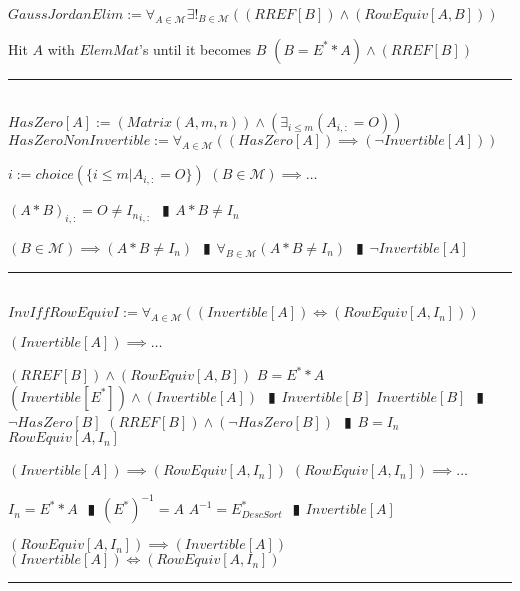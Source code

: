 \documentclass{book}
\newcommand{\abr}{:=}
\newcommand{\pipe}{$\phantom{(}\vrectangleblack\phantom{)}$}
\newcommand{\pr}[1]{\left(#1\right)}
\begin{document}
$GaussJordanElim \abr \forall_{A \in \mathcal{M}} \exists!_{B \in \mathcal{M}}\pr{(RREF[B]) \land (RowEquiv[A, B])}$
\begin{enumerate}
  \lit Hit $A$ with $ElemMat$'s until it becomes $B$
  \lit $(B = E^* * A) \land (RREF[B])$
\end{enumerate} \vspace{.75mm} \hrule \vspace{.75mm} \ \\ 

$HasZero[A] \abr \pr{Matrix(A, m, n)} \land \pr{\exists_{i \leq m}(A_{i, :} = O)}$ \\

$HasZeroNonInvertible \abr \forall_{A \in \mathcal{M}}\pr{(HasZero[A]) \implies (\lnot Invertible[A])}$
\begin{enumerate}
  \lit $i \abr choice(\{i \leq m | A_{i, :} = O\})$
  \lit $(B \in \mathcal{M}) \implies \ldots$
  \begin{enumerate}
    \lit $(A * B)_{i, :} = O \neq {I_n}_{i, :}$ \pipe $A * B \neq I_n$
  \end{enumerate}
  \lit $(B \in \mathcal{M}) \implies (A * B \neq I_n)$ \pipe $\forall_{B \in \mathcal{M}}(A * B \neq I_n)$ \pipe $\lnot Invertible[A]$
\end{enumerate} \vspace{.75mm} \hrule \vspace{.75mm} \ \\ 

$InvIffRowEquivI \abr \forall_{A \in \mathcal{M}}\pr{(Invertible[A]) \iff (RowEquiv[A, I_n])}$
\begin{enumerate}
  \lit $(Invertible[A]) \implies \ldots$
  \begin{enumerate}
    \lit $(RREF[B]) \land (RowEquiv[A, B])$
    \lit $B = E^* * A$
    \lit $(Invertible[E^*]) \land (Invertible[A])$ \pipe $Invertible[B]$
    \lit $Invertible[B]$ \pipe $\lnot HasZero[B]$
    \lit $(RREF[B]) \land (\lnot HasZero[B])$ \pipe $B = I_n$
    \lit $RowEquiv[A, I_n]$
  \end{enumerate}
  \lit $(Invertible[A]) \implies (RowEquiv[A, I_n])$
  \lit $(RowEquiv[A, I_n]) \implies \ldots$
  \begin{enumerate}
    \lit $I_n = E^* * A$ \pipe $(E^*)^{-1} = A$
    \lit $A^{-1} = E^*_{DescSort}$ \pipe $Invertible[A]$
  \end{enumerate}
  \lit $(RowEquiv[A, I_n]) \implies (Invertible[A])$
  \lit $(Invertible[A]) \iff (RowEquiv[A, I_n])$
\end{enumerate} \vspace{.75mm} \hrule \vspace{.75mm} \ \\ %
\end{document}

